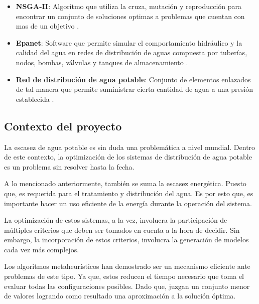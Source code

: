 \documentclass[11pt,letterpaper]{article}
\begin{document}
\begin{itemize}
\item \textbf{NSGA-II}: Algoritmo que utiliza la cruza, mutación y reproducción para encontrar un conjunto de soluciones optimas a problemas que cuentan con mas de un objetivo \cite{Deb2002}. 

\item \textbf{Epanet}: Software que permite simular el comportamiento hidráulico y la calidad del agua en redes de distribución de aguas compuesta por tuberías, nodos, bombas, válvulas y tanques de almacenamiento \cite{Rossman2017}. 
\item \textbf{Red de distribución de agua potable}: Conjunto de elementos enlazados de tal manera que permite suministrar cierta cantidad de agua a una presión establecida \cite{Doctoral2012}.
 
\end{itemize}

\subsection{Contexto del proyecto} 

La escasez de agua potable es sin duda una problemática a nivel mundial. Dentro de este contexto, la optimización de los sistemas de distribución de agua potable es un problema sin resolver hasta la fecha. 

A lo mencionado anteriormente, también se suma la escasez energética. Puesto que, es requerida para el tratamiento y distribución del agua. Es por esto que, es importante hacer un uso eficiente de la energía durante la operación del sistema.

La optimización de estos sistemas, a la vez, involucra la participación de múltiples criterios que deben ser tomados en cuenta a la hora de decidir. Sin embargo, la incorporación de estos criterios, involucra la generación de modelos cada vez más complejos.

Los algoritmos metaheurísticos han demostrado ser un mecanismo eficiente ante problemas de este tipo. Ya que, estos reducen el tiempo necesario que toma el evaluar todas las configuraciones posibles. Dado que, juzgan un conjunto menor de valores logrando como resultado una aproximación a la solución óptima.
\end{document}
